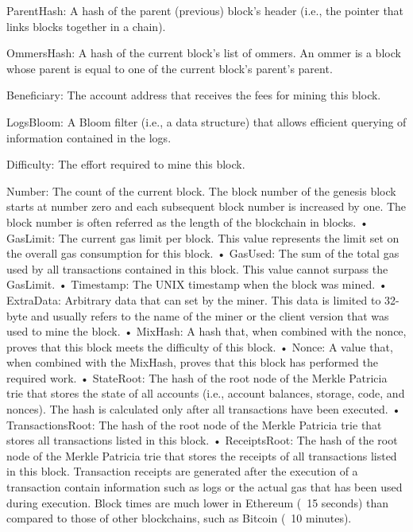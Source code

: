         ParentHash: A hash of the parent (previous) block's header (i.e., the pointer that links blocks together in a chain).

        OmmersHash: A hash of the current block's list of ommers. An ommer is a block whose parent is equal to one of the current block's parent's parent.

        Beneficiary: The account address that receives the fees for mining this block.

        LogsBloom: A Bloom filter (i.e., a data structure) that allows efficient querying of information contained in the logs.

        Difficulty: The effort required to mine this block.

        Number: The count of the current block.
        The block number of the genesis block starts at number zero and each subsequent block number is increased by one.
        The block number is often referred as the length of the blockchain in blocks.
        • GasLimit: The current gas limit per block.
        This value represents the limit set on the overall gas consumption for this block.
        • GasUsed: The sum of the total gas used by all transactions contained in this block.
        This value cannot surpass the GasLimit.
        • Timestamp: The UNIX timestamp when the block was mined.
        • ExtraData: Arbitrary data that can set by the miner.
        This data is limited to 32-byte and usually refers to the name of the miner or the client version that was used to mine the block.
        • MixHash: A hash that, when combined with the nonce, proves that this block meets the difficulty of this block.
        • Nonce: A value that, when combined with the MixHash, proves that this block has performed the required work.
        • StateRoot: The hash of the root node of the Merkle Patricia trie that stores the state of all accounts (i.e., account balances, storage, code, and nonces).
        The hash is calculated only after all transactions have been executed.
        • TransactionsRoot: The hash of the root node of the Merkle Patricia trie that stores all transactions listed in this block.
        • ReceiptsRoot: The hash of the root node of the Merkle Patricia trie that stores the receipts of all transactions listed in this block.
        Transaction receipts are generated after the execution of a transaction contain information such as logs or the actual gas that has been used during execution.
        Block times are much lower in Ethereum (~15 seconds) than compared to those of other blockchains, such as Bitcoin (~10 minutes).

